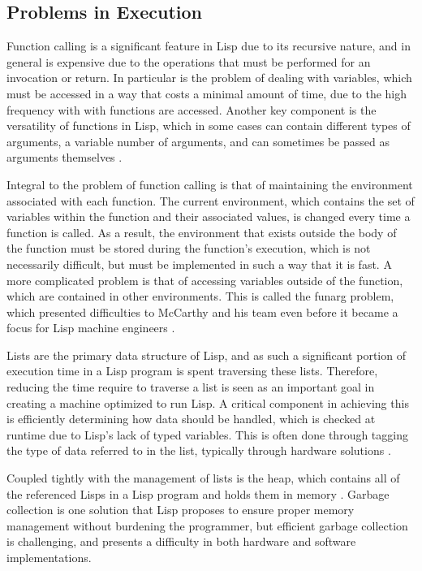 \documentclass[journal]{IEEEtran}
\begin{document}
\subsection{Problems in Execution}
Function calling is a significant feature in Lisp due to its recursive nature, and in general is expensive due to the operations that must be performed for an invocation or return. In particular is the problem of dealing with variables, which must be accessed in a way that costs a minimal amount of time, due to the high frequency with with functions are accessed. Another key component is the versatility of functions in Lisp, which in some cases can contain different types of arguments, a variable number of arguments, and can sometimes be passed as arguments themselves \cite{pt}.

Integral to the problem of function calling is that of maintaining the environment associated with each function. The current environment, which contains the set of variables within the function and their associated values, is changed every time a function is called. As a result, the environment that exists outside the body of the function must be stored during the function's execution, which is not necessarily difficult, but must be implemented in such a way that it is fast. A more complicated problem is that of accessing variables outside of the function, which are contained in other environments. This is called the funarg problem, which presented difficulties to McCarthy and his team even before it became a focus for Lisp machine engineers \cite{stoyan, pt}.

Lists are the primary data structure of Lisp, and as such a significant portion of execution time in a Lisp program is spent traversing these lists. Therefore, reducing the time require to traverse a list is seen as an important goal in creating a machine optimized to run Lisp. A critical component in achieving this is efficiently determining how data should be handled, which is checked at runtime due to Lisp's lack of typed variables. This is often done through tagging the type of data referred to in the list, typically through hardware solutions \cite{pt}.

Coupled tightly with the management of lists is the heap, which contains all of the referenced Lisps in a Lisp program and holds them in memory \cite{pt}. Garbage collection is one solution that Lisp proposes to ensure proper memory management without burdening the programmer, but efficient garbage collection is challenging, and presents a difficulty in both hardware and software implementations.
\end{document}
